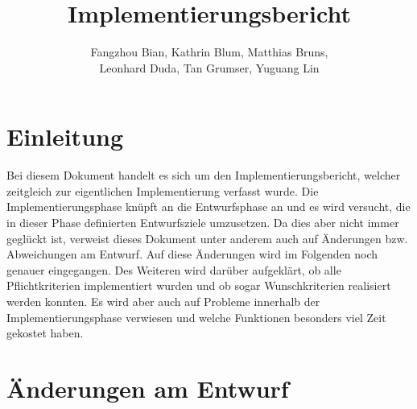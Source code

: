 \documentclass[a4paper]{scrreprt}
\begin{document}
\title{Implementierungsbericht}
\author{Fangzhou Bian, Kathrin Blum, Matthias Bruns, \\Leonhard Duda, Tan Grumser, Yuguang Lin}
\maketitle
\tableofcontents



\chapter{Einleitung}

Bei diesem Dokument handelt es sich um den Implementierungsbericht, welcher zeitgleich zur eigentlichen Implementierung verfasst wurde. Die Implementierungsphase knüpft an die Entwurfsphase an und es wird versucht, die in dieser Phase definierten Entwurfsziele umzusetzen. Da dies aber nicht immer geglückt ist, verweist dieses Dokument unter anderem auch auf Änderungen bzw. Abweichungen am Entwurf. Auf diese Änderungen wird im Folgenden noch genauer eingegangen. Des Weiteren wird darüber aufgeklärt, ob alle Pflichtkriterien implementiert wurden und ob sogar Wunschkriterien realisiert werden konnten. Es wird aber auch auf Probleme innerhalb der Implementierungsphase verwiesen und welche Funktionen besonders viel Zeit gekostet haben.

\chapter{Änderungen am Entwurf}




\printglossaries
\end{document}
